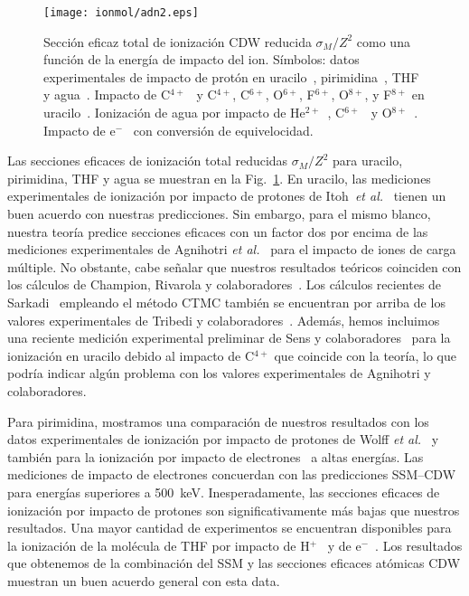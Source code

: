 \begin{figure}
\centering
\texttt{[image: ionmol/adn2.eps]}
\caption[Sección eficaz total de ionización reducida por $Z$ (Parte II).]
{Sección eficaz total de ionización CDW reducida $\sigma_{M}/Z^2$ como 
una función de la energía de impacto del ion. Símbolos: datos 
experimentales de impacto de protón en uracilo~\cite{itoh2013}, 
pirimidina~\cite{wolff2014}, THF~\cite{wang2016} y agua~\cite{Luna2007,
Bolorizadeh86,H_Rudd85,toburen80}. Impacto de C$^{4+}$~\cite{Sens:20} y 
C$^{4+}$, C$^{6+}$, O$^{6+}$, F$^{6+}$, O$^{8+}$, y F$^{8+}$ en 
uracilo~\cite{agnihotri2012,agnihotri2013}. Ionización de agua por 
impacto de He$^{2+}$~\cite{Ohsawa05,He_Rudd85,toburen80}, 
C$^{6+}$~\cite{DalCappello2009,Bhattacharjee:17} y 
O$^{8+}$~\cite{Bhattacharjee:16}. 
Impacto de e$^-$~\cite{bug2017,wolf2019,fuss2009} con conversión de 
equivelocidad.}
\label{fig:crossDNA_2}
\end{figure} 

Las secciones eficaces de ionización total reducidas $\sigma_M/Z^2$ 
para uracilo, pirimidina, THF y agua se muestran en la 
Fig.~\ref{fig:crossDNA_2}. En uracilo, las mediciones experimentales de 
ionización por impacto de protones de Itoh~\textit{et al.}~\cite{itoh2013} 
tienen un buen acuerdo con nuestras predicciones. Sin embargo, para el 
mismo blanco, nuestra teoría predice secciones eficaces con un factor 
dos por encima de las mediciones experimentales de Agnihotri 
\textit{et al.}~\cite{agnihotri2012,agnihotri2013} para el impacto de 
iones de carga múltiple. No obstante, cabe señalar que nuestros 
resultados teóricos coinciden con los cálculos de Champion, Rivarola y 
colaboradores~\cite{agnihotri2012,champion2012}. Los cálculos recientes 
de Sarkadi~\cite{sarkadi2016} empleando el método CTMC también se 
encuentran por arriba de los valores experimentales de Tribedi y 
colaboradores~\cite{agnihotri2012,agnihotri2013}. Además, hemos incluimos 
una reciente medición experimental preliminar de Sens y 
colaboradores~\cite{Sens:20} para la ionización en uracilo debido al 
impacto de C$^{4+}$ que coincide con la teoría, lo que podría indicar 
algún problema con los valores experimentales de Agnihotri y 
colaboradores. 

Para pirimidina, mostramos una comparación de nuestros resultados con los 
datos experimentales de ionización por impacto de protones de Wolff
\textit{et al.}~\cite{wolff2014} y también para la ionización por impacto 
de electrones~\cite{bug2017} a altas energías. Las mediciones de impacto 
de electrones concuerdan con las predicciones SSM--CDW para energías 
superiores a 500~keV. Inesperadamente, las secciones eficaces de 
ionización por impacto de protones son significativamente más bajas que 
nuestros resultados. Una mayor cantidad de experimentos se encuentran 
disponibles para la ionización de la molécula de THF por impacto de 
H$^+$~\cite{wang2016} y de e$^-$~\cite{bug2017,wolf2019,fuss2009}. Los 
resultados que obtenemos de la combinación del SSM y las secciones 
eficaces atómicas CDW muestran un buen acuerdo general con esta data.

